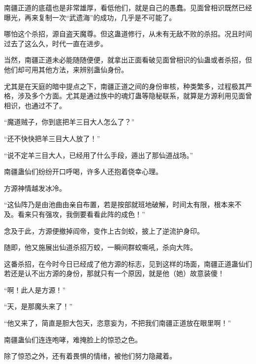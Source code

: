 \begin{this_body}
南疆正道的底蕴也是非常雄厚，看低他们，就是自己的愚蠢。见面曾相识既然已经曝光，再来复制一次“武遗海”的成功，几乎是不可能了。

哪怕这个杀招，源自盗天魔尊。但这蛊道修行，从未有无敌不败的杀招。况且时间过去了这么久，时代一直在进步。

当然，南疆正道未必能随随便便，就拿出正面看破见面曾相识的仙蛊或者杀招，但他们却可用其他方法，来辨别蛊仙身份。

尤其是在天庭的暗中提点之下，南疆正道之间的身份审核，种类繁多，过程极其严格，涉及多个方面。尤其是通过族中的魂灯蛊等隐秘联系，就算是方源利用见面曾相识，也通过不了。

“魔道贼子，你到底把羊三目大人怎么了？”

“还不快快把羊三目大人放了！”

“说不定羊三目大人，已经用了什么手段，遁出了那仙道战场。”

南疆蛊仙们纷纷开口呼喝，许多人还抱着侥幸心理。

方源神情越发冰冷。

“这仙阵乃是由池曲由亲自布置，若是按部就班地破解，时间太有限，根本来不及。看来只有强攻，我倒要看看此阵的成色！”

念及于此，方源便撤掉阎帝，变作上古剑蛟，披上了逆流护身印。

随即，他又施展出仙道杀招万蛟，一瞬间群蛟嘶吼，杀向大阵。

这番杀招，在今时今日已经成了他方源的标志，见到这样的场面，南疆正道蛊仙们若还是认不出方源的身份，那就只有一个原因，就是他（她）故意装傻！

“啊！此人是方源！”

“天，是那魔头来了！”

“他又来了，简直是胆大包天，恣意妄为，不把我们南疆正道放在眼里啊！”

南疆蛊仙们连连咆哮，难掩脸上的惊恐之色。

除了惊恐之外，还有着畏惧的情绪，被他们努力隐藏着。

\end{this_body}


